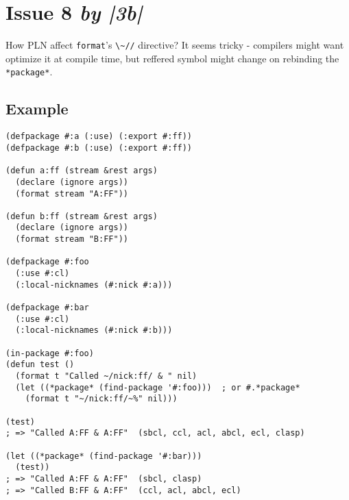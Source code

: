\documentclass[11pt]{article}
\author{Grolter Bell}
\date{\today}
\title{}
\begin{document}
\section{Issue 8 \emph{by |3b|}}
\label{sec:orgbed07e2}
How PLN affect \texttt{format}'s \texttt{\textbackslash{}\textasciitilde{}//} directive? It seems tricky - compilers might
want optimize it at compile time, but reffered symbol might change on
rebinding the \texttt{*package*}.
\subsection{Example}
\label{sec:org2e67018}
\begin{verbatim}
(defpackage #:a (:use) (:export #:ff))
(defpackage #:b (:use) (:export #:ff))

(defun a:ff (stream &rest args)
  (declare (ignore args))
  (format stream "A:FF"))

(defun b:ff (stream &rest args)
  (declare (ignore args))
  (format stream "B:FF"))

(defpackage #:foo
  (:use #:cl)
  (:local-nicknames (#:nick #:a)))

(defpackage #:bar
  (:use #:cl)
  (:local-nicknames (#:nick #:b)))

(in-package #:foo)
(defun test ()
  (format t "Called ~/nick:ff/ & " nil)
  (let ((*package* (find-package '#:foo)))  ; or #.*package*
    (format t "~/nick:ff/~%" nil)))

(test)
; => "Called A:FF & A:FF"  (sbcl, ccl, acl, abcl, ecl, clasp)

(let ((*package* (find-package '#:bar)))
  (test))
; => "Called A:FF & A:FF"  (sbcl, clasp)
; => "Called B:FF & A:FF"  (ccl, acl, abcl, ecl)
\end{verbatim}
\end{document}
